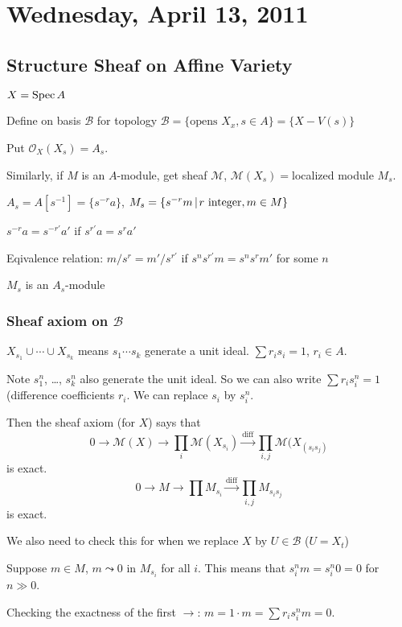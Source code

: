 \documentclass [letterpaper,11pt,twoside]{article}
\begin{document}
\setcounter {section}{25}\section {Wednesday, April 13, 2011}
  \subsection*{Structure Sheaf on Affine Variety}
    $X = \operatorname{Spec} A$

    Define on basis $\mathcal B$ for topology $\mathcal B = \{\text{opens
    }X_x,s\in A\} = \{X - V(s)\}$

    Put $\mathcal O_X(X_s) = A_s$.

    Similarly, if $M$ is an $A$-module, get sheaf $\mathcal M$, $\mathcal M(X_s)
    = $localized module $M_s$.

    $A_s = A[s^{-1}] = \{s^{-r}a\}$, $M_s = \mathset[s^{-r}m]{r\text{ integer},
    m\in M}$

    $s^{-r}a = s^{-r'}a'$ if $s^{r'}a = s^ra'$

    Eqivalence relation: $m / s^r = m' / s^{r'}$ if $s^n s^{r'} m = s^n s^r m'$
    for some $n$

    $M_s$ is an $A_s$-module

    \subsubsection*{Sheaf axiom on \texorpdfstring{$\mathcal B$}{B}}
      $X_{s_1} \cup \cdots \cup X_{s_k}$ means $s_1 \cdots s_k$ generate a unit
      ideal.  $\sum r_i s_i = 1$, $r_i\in A$.

      Note $s_1^n$, \ldots, $s_k^n$ also generate the unit ideal.  So we can
      also write $\sum r_i s_i^n = 1$ (difference coefficients $r_i$.  We can
      replace $s_i$ by $s_i^n$.

      Then the sheaf axiom (for $X$) says that
      $$0 \to \mathcal M(X) \to \prod_i \mathcal M(X_{s_i})
      \xrightarrow{\text{diff}} \prod_{i,j} \mathcal M(X_{(s_i s_j)}$$
      is exact.
      $$0 \to M \to \prod M_{s_i} \xrightarrow{\text{diff}} \prod_{i,j} M_{s_i s_j}$$
      is exact.

      We also need to check this for when we replace $X$ by $U \in \mathcal B$
      ($U = X_t$)

      Suppose $m\in M$, $m \leadsto 0$ in $M_{s_i}$ for all $i$.  This means
      that $s_i^n m = s_i^n 0 = 0$ for $n \gg 0$.

      Checking the exactness of the first $\to$: $m = 1\cdot m = \sum r_i s_i^n m = 0$.
\end{document}
